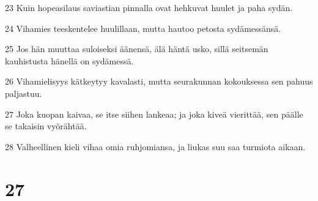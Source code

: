 \par 23 Kuin hopeasilaus saviastian pinnalla ovat hehkuvat huulet ja paha sydän.
\par 24 Vihamies teeskentelee huulillaan, mutta hautoo petosta sydämessänsä.
\par 25 Jos hän muuttaa suloiseksi äänensä, älä häntä usko, sillä seitsemän kauhistusta hänellä on sydämessä.
\par 26 Vihamielisyys kätkeytyy kavalasti, mutta seurakunnan kokouksessa sen pahuus paljastuu.
\par 27 Joka kuopan kaivaa, se itse siihen lankeaa; ja joka kiveä vierittää, sen päälle se takaisin vyörähtää.
\par 28 Valheellinen kieli vihaa omia ruhjomiansa, ja liukas suu saa turmiota aikaan.

\chapter{27}


